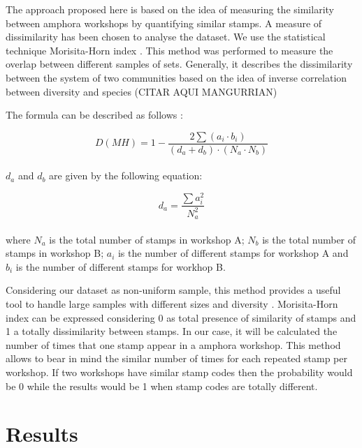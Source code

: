 \documentclass[review]{elsarticle}
\begin{document}
The approach proposed here is based on the idea of measuring the similarity between amphora workshops by quantifying similar stamps. A measure of dissimilarity has been chosen to analyse the dataset. We use the statistical technique Morisita-Horn index \citep{morisita_measuring_1959, horn_measurement_1966}. This method was performed to measure the overlap between different samples of sets. Generally, it describes the dissimilarity between the system of two communities based on the idea of inverse correlation between diversity and species (CITAR AQUI MANGURRIAN)

The formula can be described as follows \citep{magurran_measuring_2013}:

\begin{equation}
D(MH) = 1- \frac{2 \sum(a_{i} \cdot b_{i})}{(d_{a} + d_{b}) \cdot (N_{a} \cdot N_{b})}
\end{equation} \\

$d_{a}$ and $d_{b}$ are given by the following equation:

\begin{equation}
d_{a} = \frac{\sum a_{i}^{2}}{N_{a}^{2}} 
\end{equation} \\

where $N_{a}$ is the total number of stamps in workshop A; $N_{b}$ is the total number of stamps in workshop B; $a_{i}$ is the number of different stamps for workshop A and $b_{i}$ is the number of different stamps for workhop B.

Considering our dataset as non-uniform sample, this method provides a useful tool to handle large samples with different sizes and diversity \citep{wolda_similarity_1981}. Morisita-Horn index can be expressed considering 0 as total presence of similarity of stamps and 1 a totally dissimilarity between stamps. In our case, it will be calculated the number of times that one stamp appear in a amphora workshop. This method allows to bear in mind the similar number of times for each repeated stamp per workshop. If two workshops have similar stamp codes then the probability would be 0 while the results would be 1 when stamp codes are totally different. 


\section{Results}
\end{document}

